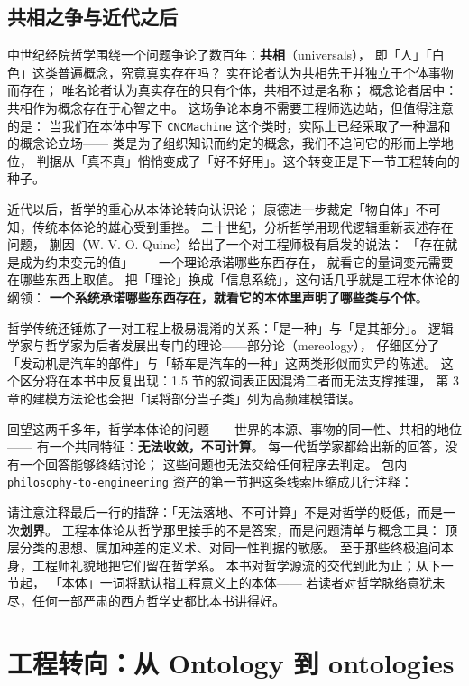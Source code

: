 \subsection{共相之争与近代之后}

中世纪经院哲学围绕一个问题争论了数百年：\textbf{共相}（universals），
即「人」「白色」这类普遍概念，究竟真实存在吗？
实在论者认为共相先于并独立于个体事物而存在；
唯名论者认为真实存在的只有个体，共相不过是名称；
概念论者居中：共相作为概念存在于心智之中。
这场争论本身不需要工程师选边站，但值得注意的是：
当我们在本体中写下 \texttt{CNCMachine} 这个类时，实际上已经采取了一种温和的概念论立场——
类是为了组织知识而约定的概念，我们不追问它的形而上学地位，
判据从「真不真」悄悄变成了「好不好用」。这个转变正是下一节工程转向的种子。

近代以后，哲学的重心从本体论转向认识论；
康德进一步裁定「物自体」不可知，传统本体论的雄心受到重挫。
二十世纪，分析哲学用现代逻辑重新表述存在问题，
蒯因（W. V. O. Quine）给出了一个对工程师极有启发的说法：
「存在就是成为约束变元的值」——一个理论承诺哪些东西存在，
就看它的量词变元需要在哪些东西上取值。
把「理论」换成「信息系统」，这句话几乎就是工程本体论的纲领：
\textbf{一个系统承诺哪些东西存在，就看它的本体里声明了哪些类与个体}。

哲学传统还锤炼了一对工程上极易混淆的关系：「是一种」与「是其部分」。
逻辑学家与哲学家为后者发展出专门的理论——部分论（mereology），
仔细区分了「发动机是汽车的部件」与「轿车是汽车的一种」这两类形似而实异的陈述。
这个区分将在本书中反复出现：1.5 节的叙词表正因混淆二者而无法支撑推理，
第 3 章的建模方法论也会把「误将部分当子类」列为高频建模错误。

回望这两千多年，哲学本体论的问题——世界的本源、事物的同一性、共相的地位——
有一个共同特征：\textbf{无法收敛，不可计算}。
每一代哲学家都给出新的回答，没有一个回答能够终结讨论；
这些问题也无法交给任何程序去判定。
包内 \texttt{philosophy-to-engineering} 资产的第一节把这条线索压缩成几行注释：



请注意注释最后一行的措辞：「无法落地、不可计算」不是对哲学的贬低，而是一次\textbf{划界}。
工程本体论从哲学那里接手的不是答案，而是问题清单与概念工具：
顶层分类的思想、属加种差的定义术、对同一性判据的敏感。
至于那些终极追问本身，工程师礼貌地把它们留在哲学系。
本书对哲学源流的交代到此为止；从下一节起，
「本体」一词将默认指工程意义上的本体——
若读者对哲学脉络意犹未尽，任何一部严肃的西方哲学史都比本书讲得好。

\section{工程转向：从 Ontology 到 ontologies}

